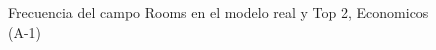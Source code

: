 \begin{figure}[H]
    \centering
    
    \caption{Frecuencia del campo Rooms en el modelo real y Top 2, Economicos (A-1)}
    \label{frecuency-Rooms-top2}
\end{figure}